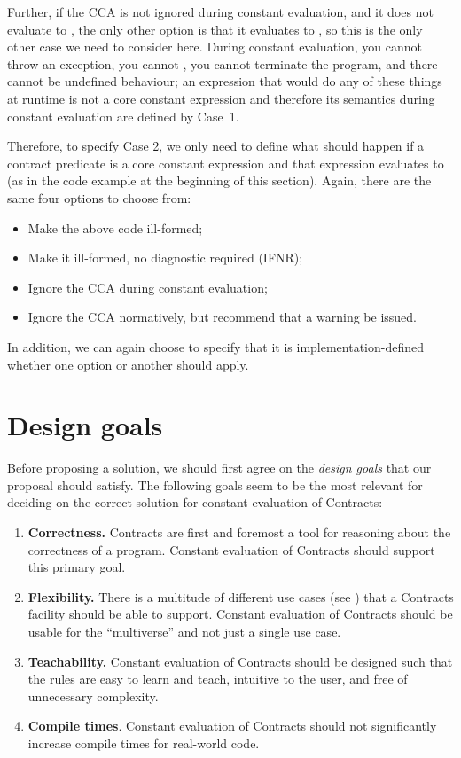 Further, if the CCA is not ignored during constant evaluation, and it does not evaluate to , the only other option is that it evaluates to , so this is the only other case we need to consider here. During constant evaluation, you cannot throw an exception, you cannot , you cannot terminate the program, and there cannot be undefined behaviour; an expression that would do any of these things at runtime is not a core constant expression and therefore its semantics during constant evaluation are defined by \mbox{Case 1}.

Therefore, to specify Case 2, we only need to define what should happen if a contract predicate is a core constant expression and that expression evaluates to  (as in the code example at the beginning of this section). Again, there are the same four options to choose from:

\begin{itemize}
\item Make the above code ill-formed;
\item Make it ill-formed, no diagnostic required (IFNR);
\item Ignore the CCA during constant evaluation;
\item Ignore the CCA normatively, but recommend that a warning be issued.
\end{itemize}

In addition, we can again choose to specify that it is implementation-defined whether one option or another should apply.

\section{Design goals}

Before proposing a solution, we should first agree on the \emph{design goals} that our proposal should satisfy. The following goals seem to be the most relevant for deciding on the correct solution for constant evaluation of Contracts:

\begin{enumerate}
\item \textbf{Correctness.} Contracts are first and foremost a tool for reasoning about the correctness of a program. Constant evaluation of Contracts should support this primary goal. 
\item \textbf{Flexibility.} There is a multitude of different use cases (see \cite{P1995R1}) that a Contracts facility should be able to support. Constant evaluation of Contracts should be usable for the ``multiverse'' and not just a single use case.
\item \textbf{Teachability.} Constant evaluation of Contracts should be designed such that the rules are easy to learn and teach, intuitive to the user, and free of unnecessary complexity.
\item \textbf{Compile times}. Constant evaluation of Contracts should not significantly increase compile times for real-world code.
\end{enumerate}

